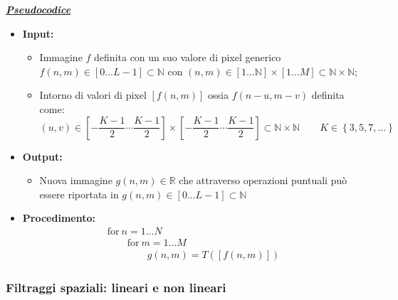 \documentclass[a4paper]{article}
\begin{document}
	\noindent
	\textcolor{Red3}{\textbf{\underline{\emph{Pseudocodice}}}}\newline
	
	\begin{itemize}
		\item \textbf{Input:}
		\begin{itemize}
			\item Immagine $f$ definita con un suo valore di pixel generico $f\left(n,m\right) \in \left[0 ... L - 1\right] \subset \mathbb{N}$ con $\left(n,m\right) \in \left[1 ... \mathbb{N}\right] \times \left[1 ... M\right] \subset \mathbb{N} \times \mathbb{N}$;
			
			\item Intorno di valori di pixel $\left[f\left(n,m\right)\right]$ ossia $f\left(n-u, m-v\right)$ definita come:
			\begin{equation*}
				\left(u,v\right) \in \left[-\dfrac{K-1}{2} \cdots \dfrac{K-1}{2}\right] \times \left[-\dfrac{K-1}{2} \cdots \dfrac{K-1}{2}\right] \subset \mathbb{N} \times \mathbb{N} \hspace{2em} K \in \left\{3,5,7,...\right\}
			\end{equation*}
		\end{itemize}
		
		\item \textbf{Output:}
		\begin{itemize}
			\item Nuova immagine $g\left(n,m\right) \in \mathbb{R}$ che attraverso operazioni puntuali può essere riportata in $g\left(n,m\right) \in \left[0 ... L-1\right] \subset \mathbb{N}$
		\end{itemize}
	
		\item \textbf{Procedimento:}
		\begin{equation*}
			\begin{array}{l}
				\mathrm{for} \: n = 1 ... N \\
				\hspace{2em} \mathrm{for} \: m = 1 ... M \\
				\hspace{4em} g\left(n,m\right) = T\left(\left[f\left(n,m\right)\right]\right)
			\end{array}
		\end{equation*}
	\end{itemize}

	\newpage
	
	\subsubsection{Filtraggi spaziali: lineari e non lineari}
	
\end{document}
